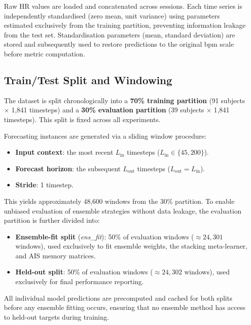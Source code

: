 \documentclass[11pt,a4paper]{article}
\begin{document}
Raw HR values are loaded and concatenated across sessions.  Each time series is
independently standardised (zero mean, unit variance) using parameters
estimated exclusively from the training partition, preventing information
leakage from the test set.  Standardisation parameters (mean, standard
deviation) are stored and subsequently used to restore predictions to the
original bpm scale before metric computation.

\subsection{Train/Test Split and Windowing}

The dataset is split chronologically into a \textbf{70\% training partition}
(91 subjects $\times$ 1{,}841 timesteps) and a \textbf{30\% evaluation
partition} (39 subjects $\times$ 1{,}841 timesteps).  This split is fixed
across all experiments.

Forecasting instances are generated via a sliding window procedure:
\begin{itemize}
  \item \textbf{Input context}: the most recent $L_{\mathrm{in}}$ timesteps
        ($L_{\mathrm{in}} \in \{45, 200\}$).
  \item \textbf{Forecast horizon}: the subsequent $L_{\mathrm{out}}$ timesteps
        ($L_{\mathrm{out}} = L_{\mathrm{in}}$).
  \item \textbf{Stride}: 1 timestep.
\end{itemize}

This yields approximately 48{,}600 windows from the 30\% partition.  To enable
unbiased evaluation of ensemble strategies without data leakage, the evaluation
partition is further divided into:
\begin{itemize}
  \item \textbf{Ensemble-fit split} (\textit{ens\_fit}): 50\% of evaluation
        windows (${\approx}24{,}301$ windows), used exclusively to fit ensemble
        weights, the stacking meta-learner, and AIS memory matrices.
  \item \textbf{Held-out split}: 50\% of evaluation windows
        (${\approx}24{,}302$ windows), used exclusively for final performance
        reporting.
\end{itemize}

All individual model predictions are precomputed and cached for both splits
before any ensemble fitting occurs, ensuring that no ensemble method has access
to held-out targets during training.
\end{document}
